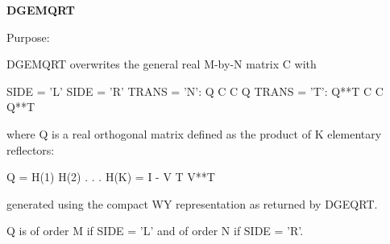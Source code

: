 {\bfseries D\+G\+E\+M\+Q\+R\+T} 

 \begin{DoxyParagraph}{Purpose\+: }
\begin{DoxyVerb} DGEMQRT overwrites the general real M-by-N matrix C with

                 SIDE = 'L'     SIDE = 'R'
 TRANS = 'N':      Q C            C Q
 TRANS = 'T':   Q**T C            C Q**T

 where Q is a real orthogonal matrix defined as the product of K
 elementary reflectors:

       Q = H(1) H(2) . . . H(K) = I - V T V**T

 generated using the compact WY representation as returned by DGEQRT. 

 Q is of order M if SIDE = 'L' and of order N  if SIDE = 'R'.\end{DoxyVerb}
 
\end{DoxyParagraph}

